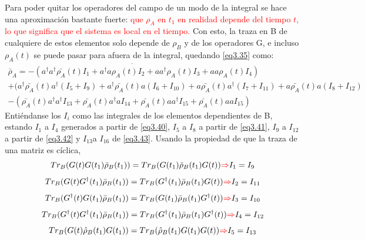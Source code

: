 \documentclass{book}
\begin{document}
 Para poder quitar los operadores del campo de un modo de la integral se hace una aproximación bastante fuerte: \textcolor{Red}{que $\rho_A$ en $t_1$ en realidad depende del tiempo $t$, lo que significa que el sistema es local en el tiempo.}
 Con esto, la traza en B de cualquiere de estos elementos solo depende de $\rho_B$ y de los operadores G, e incluso $\rho_A(t)$ se puede pasar para afuera de la integral, quedando \textcolor{blue}{\ref{eq3.35}} como:
  \begin{equation}\label{eq3.44}\begin{aligned}\dot{\bar{\rho}_A=-(a^\dag a^\dag \bar{\rho_A}(t)I_1+a^\dag a \rho_A(t) I_2+ aa^\dag \rho_A(t) I_3+aa\rho_A(t) I_4)} \\ {+(a^\dag\bar{\rho_A}(t)a^\dag (I_5+I_9)+a^\dag\bar{\rho_A}(t)a (I_6+I_{10})+ a\bar{\rho_A}(t)a^\dag (I_7+I_{11})+a\bar{\rho_A}(t)a (I_8+I_{12})} \\ {-(\bar{\rho_A}(t)a^\dag a^\dag I_{13}+\bar{\rho_A}(t)a^\dag a I_{14}+ \bar{\rho_A}(t)aa^\dag I_{15}+\bar{\rho_A}(t)aa I_{15})} \end{aligned}\end{equation}
 Entiéndanse los $I_i$ como las integrales de los elementos dependientes de B, estando $I_1$ a $I_4$ generados a partir de \textcolor{blue}{\ref{eq3.40}}, $I_5$ a $I_8$ a partir de \textcolor{blue}{\ref{eq3.41}}, $I_9$ a $I_{12}$ a partir de \textcolor{blue}{\ref{eq3.42}} y $I_{13}$a $I_{16}$ de \textcolor{blue}{\ref{eq3.43}}.
 Usando la propiedad de que la traza de una matriz es cíclica, 
 \begin{equation}\label{eq3.45} {Tr_B(G(t)G(t_1)\bar{\rho}_B(t_1))=Tr_B(G(t_1)\bar{\rho}_B(t_1)G(t))\textcolor{red}{\Rightarrow} I_{1}=I_{9} }\end{equation}
 \begin{equation}\label{eq3.46} {Tr_B(G(t)G^\dag(t_1)\bar{\rho}_B(t_1))=Tr_B(G^\dag(t_1)\bar{\rho}_B(t_1)G(t))\textcolor{red}{\Rightarrow} I_{2}=I_{11}}\end{equation}
 \begin{equation}\label{eq3.47}{ Tr_B(G^\dag(t)G(t_1)\bar{\rho}_B(t_1))=Tr_B(G(t_1)\bar{\rho}_B(t_1)G^\dag(t))\textcolor{red}{\Rightarrow} I_{3}=I_{10} }\end{equation}
 \begin{equation}\label{eq3.48}{Tr_B(G^\dag(t)G^\dag(t_1)\bar{\rho}_B(t_1))=Tr_B(G^\dag(t_1)\bar{\rho}_B(t_1)G^\dag(t))\textcolor{red}{\Rightarrow} I_{4}=I_{12}}\end{equation}
 \begin{equation} \label{eq3.49}{ Tr_B(G(t)\hat{\rho}_B(t_1)G(t_1))=Tr_B(\hat{\rho}_B(t_1)G(t_1)G(t)) \textcolor{red}{\Rightarrow} I_{5}=I_{13}
}\end{equation}
\end{document}
